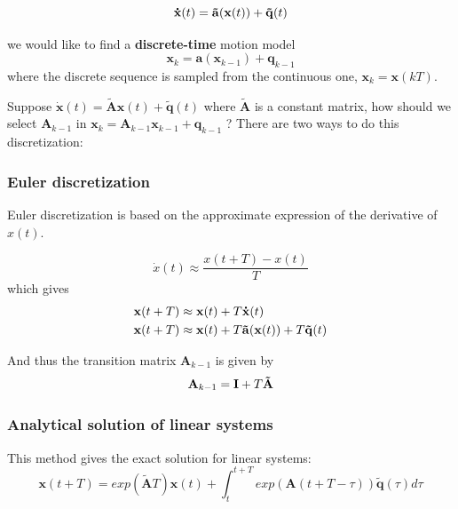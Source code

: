 \begin{equation}
    \mathbf{\dot{x}}(t) = \mathbf{\Tilde{a}}(\mathbf{x}(t)) + \mathbf{\Tilde{q}}(t)
\end{equation}

we would like to find a \textbf{discrete-time} motion model
\begin{equation}
    \mathbf{x}_k = \mathbf{a}(\mathbf{x}_{k-1}) + \mathbf{q}_{k-1}
\end{equation}
where the discrete sequence is sampled from the continuous one, $\mathbf{x}_k = \mathbf{x}(kT)$.


Suppose $\mathbf{\dot{x}}(t) = \mathbf{\tilde{A}}\mathbf{x}(t) + \mathbf{\tilde{q}}(t)$ where $\mathbf{\tilde{A}}$ is a constant matrix, how should we select $\mathbf{A}_ {k-1}$ in $\mathbf{x}_k = \mathbf{A}_{k-1} \mathbf{x}_{k-1} + \mathbf{q}_{k-1}$ ? There are two ways to do this discretization:

\subsubsection{Euler discretization}

Euler discretization is based on the approximate expression of the derivative of $x(t)$.

\begin{equation}
    \dot{x}(t) \approx \frac{x(t+T)-x(t)}{T}
\end{equation}
which gives
\begin{align}
    \mathbf{x}(t+T) & \approx \mathbf{x}(t) + T \mathbf{\dot{x}}(t) \\
     \mathbf{x}(t+T)  & \approx \mathbf{x}(t) + T \mathbf{\Tilde{a}}(\mathbf{x}(t)) + T \mathbf{\Tilde{q}}(t)
\end{align}

And thus the transition matrix $\mathbf{A}_{k-1}$ is given by 
\begin{equation}
    \mathbf{A}_{k-1} = \mathbf{I} + T \mathbf{\Tilde{A}}
\end{equation}

\subsubsection{Analytical solution of linear systems}

This method gives the exact solution for linear systems:
\begin{equation}
    \mathbf{x}(t+T) = exp(\mathbf{\tilde{A}}T)\mathbf{x}(t) + \int_t^{t+T} exp(\mathbf{A}(t+T-\tau)) \mathbf{\tilde{q}}(\tau) d\tau
\end{equation}

